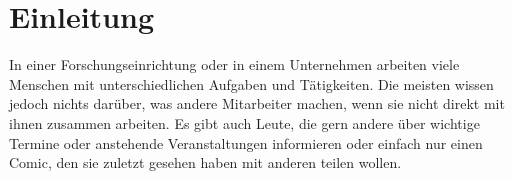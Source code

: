\chapter{Einleitung}\label{Einleitung}
In einer Forschungseinrichtung oder in einem Unternehmen arbeiten viele Menschen mit unterschiedlichen Aufgaben und Tätigkeiten.
Die meisten wissen jedoch nichts darüber, was andere Mitarbeiter machen, wenn sie nicht direkt mit ihnen zusammen arbeiten.
Es gibt auch Leute, die gern andere über wichtige Termine oder anstehende Veranstaltungen informieren oder einfach nur einen Comic, den sie zuletzt gesehen haben mit anderen teilen wollen.





